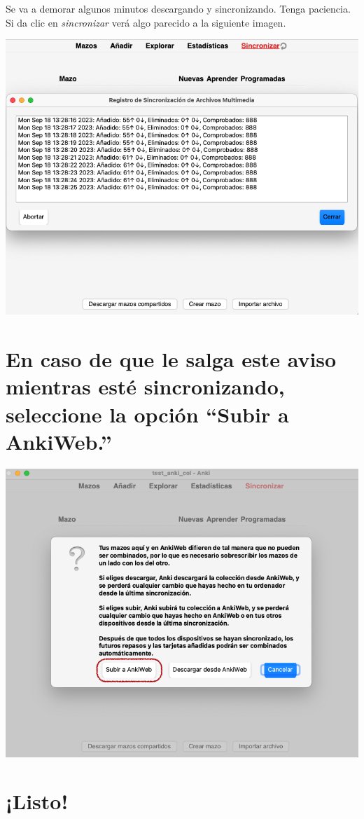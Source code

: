 \documentclass[
]{book}
\begin{document}
Se va a demorar algunos minutos descargando y sincronizando. Tenga paciencia. Si da clic en \emph{sincronizar} verá algo parecido a la siguiente imagen.

\includegraphics[width=0.6\linewidth]{images/reposit_sp/sincronizar}

\hypertarget{en-caso-de-que-le-salga-este-aviso-mientras-estuxe9-sincronizando-seleccione-la-opciuxf3n-subir-a-ankiweb.}{%
\section*{En caso de que le salga este aviso mientras esté sincronizando, seleccione la opción ``Subir a AnkiWeb.''}\label{en-caso-de-que-le-salga-este-aviso-mientras-estuxe9-sincronizando-seleccione-la-opciuxf3n-subir-a-ankiweb.}}

\includegraphics[width=0.6\linewidth]{images/reposit_sp/subir_a_anki}

\hypertarget{listo}{%
\section{¡Listo!}\label{listo}}
\end{document}
